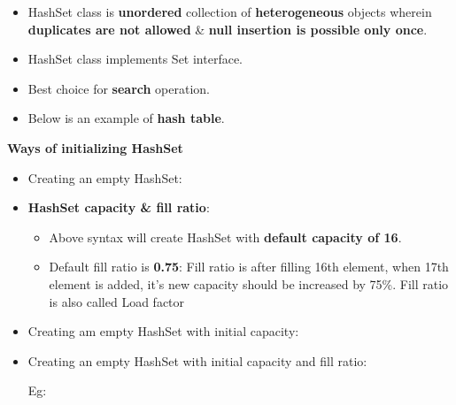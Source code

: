 \setlength{\columnsep}{3pt}
\begin{flushleft}

	\begin{itemize}
		\item HashSet class is \textbf{unordered} collection of \textbf{heterogeneous} objects wherein \textbf{duplicates are not allowed} \& \textbf{null insertion is possible only once}.
		\item  HashSet class implements Set interface.
		\item Best choice for \textbf{search} operation.		
		\item Below is an example of \textbf{hash table}.
	\end{itemize}
	
	\textbf{Ways of initializing HashSet}
	
	\begin{itemize}
		\item Creating an empty HashSet:
		\bigskip
		\bigskip
		\item \textbf{HashSet capacity \& fill ratio}:
		\begin{itemize}
			\item Above syntax will create HashSet with \textbf{default capacity of 16}.
			\item Default fill ratio is \textbf{0.75}: Fill ratio is after filling 16th element, when 17th element is added, it’s new capacity should be increased by 75\%. Fill ratio is also called Load factor			
		\end{itemize}		
		\item Creating am empty HashSet with initial capacity:
		\bigskip
		
		\newpage
		\item Creating an empty HashSet with initial capacity and fill ratio:
		\bigskip
		
		Eg:
	\end{itemize}
	

\end{flushleft}
